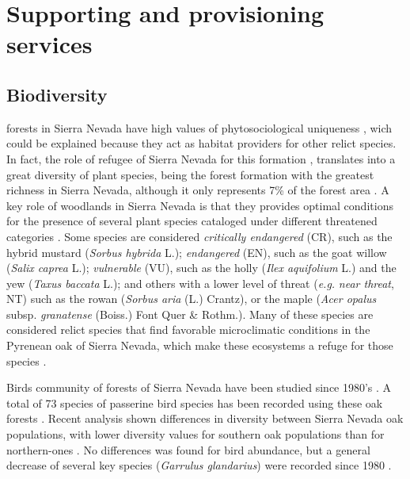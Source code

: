 \section{Supporting and provisioning services}\label{sec:es:provision}
\subsection{Biodiversity}\label{sec:es:provision-biodiversity}

\Qp forests in Sierra Nevada have high values of phytosociological uniqueness \autocites{Loriteetal2008PhytosociologicalReview}, wich could be explained because they act as habitat providers for other relict species. In fact, the role of refugee of Sierra Nevada for this formation \autocites{Breweretal2002SpreadDeciduous,Olaldeetal2002WhiteOaks,RodriguezSanchezetal2010TreeRange}, translates into a great diversity of plant species, being the forest formation with the greatest richness in Sierra Nevada, although it only represents 7\% of the forest area \autocites{PerezLuqueetal2014SinfonevadaDataset}. A key role of \Qp woodlands in Sierra Nevada is that they provides optimal conditions for the presence of several plant species cataloged under different threatened categories \autocites{Lorite2016UpdatedChecklist,Losaetal1986PaisajeVegetal,MelendoValle2000EstudioComparativo}. Some species are considered \emph{critically endangered} (CR), such as the hybrid mustard (\emph{Sorbus hybrida} L.); \emph{endangered} (EN), such as the goat willow (\emph{Salix caprea} L.); \emph{vulnerable} (VU), such as the holly (\emph{Ilex aquifolium} L.) and the yew (\emph{Taxus baccata} L.); and others with a lower level of threat (\emph{e.g.} \emph{near threat}, NT) such as the rowan (\emph{Sorbus aria} (L.) Crantz), or the maple (\emph{Acer opalus} subsp. \emph{granatense} (Boiss.) Font Quer \& Rothm.). Many of these species are considered relict species that find favorable microclimatic conditions in the Pyrenean oak of Sierra Nevada, which make these ecosystems a refuge for those species \autocites{Blancaetal1998ThreatenedVascular,Lorite2016UpdatedChecklist,Losaetal1986PaisajeVegetal}. 

Birds community of \Qp forests of Sierra Nevada have been studied since 1980's \autocites{ZamoraCamacho1984EvolucionEstacional,ZamoraBareaAzcon2015LongTermChanges,BareaAzconetal2012PasseriformesOtras}. A total of 73 species of passerine bird species has been recorded using these oak forests \autocites{PerezLuqueetal2016DatasetPasserine}. Recent analysis shown differences in diversity between Sierra Nevada oak populations, with lower diversity values for southern oak populations than for northern-ones \autocites{PerezLuqueetal2021ManualGestion}. No differences was found for bird abundance, but a general decrease of several key species (\emph{Garrulus glandarius}) were recorded since 1980 \autocites{ZamoraBareaAzcon2015LongTermChanges}. 

